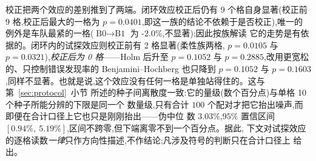 \documentclass[manuscript,screen,review]{acmart}
\newcommand{\NCases}{10}
\newcommand{\NSeeds}{10}
\newcommand{\NPairs}{100}
\newcommand{\HLProbeLoop}{3.03\%}
\newcommand{\CIProbeLoop}{$[0.94\%,\ 5.19\%]$}
\newcommand{\CellsSigLoop}{9}
\newcommand{\CellsSigLoopAdj}{9}
\newcommand{\CellsSigProbe}{2}
\newcommand{\CellsSigProbeAdj}{0}
\newcommand{\GainLoopStarve}{-2.0\%}     %
\newcommand{\PProbeFlexLoRaw}{=0.0105}
\newcommand{\PProbeFlexLoHolm}{=0.1052}
\newcommand{\PProbeFlexLoBH}{=0.1052}
\newcommand{\PProbeFlexHiRaw}{=0.0321}
\newcommand{\PProbeFlexHiHolm}{=0.2885}
\newcommand{\PProbeFlexHiBH}{=0.1603}
\newcommand{\PLoopCellMax}{=0.0401}
\begin{document}
校正把两个效应的差别推到了两端。闭环效应校正后仍有 \CellsSigLoopAdj{} 个格自身显著(校正前
\CellsSigLoop{} 格,校正后最大的一格为 $p\PLoopCellMax$,即这一族的结论不依赖于是否校正),唯一的
例外是车队最紧的一格($\text{B0}\to\text{B1}$ 为 \GainLoopStarve{},不显著);因此按族解读
它的走势是有依据的。闭环内的试探效应则校正前有 \CellsSigProbe{} 格显著(柔性族两格,
$p\PProbeFlexLoRaw$ 与 $p\PProbeFlexHiRaw$),\emph{校正后为 \CellsSigProbeAdj{} 格}——Holm 后升至
$p\PProbeFlexLoHolm$ 与 $p\PProbeFlexHiHolm$,改用更宽松的、只控制错误发现率的
Benjamini--Hochberg 也只降到 $p\PProbeFlexLoBH$ 与 $p\PProbeFlexHiBH$,同样不显著。也就是说,这个效应没有任何一格是单独站得住的。这与第~\ref{sec:protocol}~小节
所述的种子间离散度一致:它的量级(数个百分点)与单格 \NSeeds{} 个种子所能分辨的下限是同一个
数量级,只有合计 $\NPairs$ 个配对才把它抬出噪声,而即便在合计口径上它也只是刚刚抬出——伪中位
数 \HLProbeLoop{},$95\%$ 置信区间 \CIProbeLoop{},区间不跨零,但下端离零不到一个百分点。据此,
下文对试探效应的逐格读数\emph{一律}只作方向性描述,不作结论;凡涉及符号的判断只在合计口径上
给出。

\begin{table}[t]
\caption{逐算例格的四级阶梯结果与两个主效应,按三个因子族分组($n=\NSeeds$ 个按种子配对的
比较每格)。显著性标记按 \textbf{Holm 校正后}的 $p$ 给出(双侧 Wilcoxon 符号秩检验),族为一个效应的
\NCases{} 个格:
$^{*}p<0.05$、$^{**}p<0.01$;$^{\dagger}$ 表示该格\emph{校正前}显著而校正后不显著,即不足以
支撑关于其符号的任何主张。争用强度由算例结构决定,一并列出以便判断收益是否
随其变化。负值表示完工时间下降。两个增益列与表~\ref{tab:main} 用同一个估计量,即逐对相对
增益在种子上的均值,因此十格的均值在舍入误差内等于表~\ref{tab:main} 的合计值(逐位复算请用
未舍入值);代价是该列不能由同一行的两个均值列相除反推。\texttt{A funnel} 一行同时是 B 族的 $N_A/N_M=1.5$ 与 C 族的
$F=0.6$,只运行一次,故只列一行。}
\label{tab:bytag}
\small

\end{table}
\end{document}
